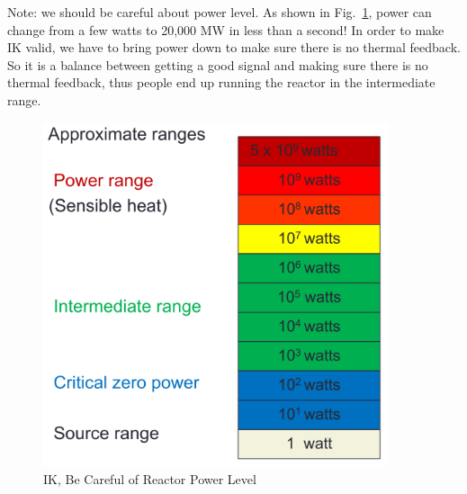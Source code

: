 \documentclass{school-22.211-notes}
\begin{document}
Note: we should be careful about power level. As shown in Fig.~\ref{power-range}, power can change from a few watts to 20,000 MW in less than a second! In order to make IK valid, we have to bring power down to make sure there is no thermal feedback. So it is a balance between getting a good signal and making sure there is no thermal feedback, thus people end up running the reactor in the intermediate range. 
\begin{figure}[ht]
  \centering
  \includegraphics[width=4in]{images/pke/power-range.png}
  \caption{IK, Be Careful of Reactor Power Level} \label{power-range}
\end{figure}
\end{document}
